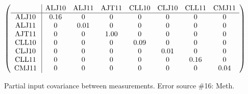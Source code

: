 \begin{table}[H]
\scriptsize
\begin{center}
\renewcommand{\arraystretch}{1.1}
\begin{math}\left(\begin{array}{c|ccccccc}
 & \mathrm{ALJ10} & 
\mathrm{ALJ11} & 
\mathrm{AJT11} & 
\mathrm{CLL10} & 
\mathrm{CLJ10} & 
\mathrm{CLL11} & 
\mathrm{CMJ11} \\
\hline
\mathrm{ALJ10} \hspace*{2pt} &       0.16 &  0 &  0 &  0 &  0 &  0 &  0 \\
\mathrm{ALJ11} \hspace*{2pt} &  0 &       0.01 &  0 &  0 &  0 &  0 &  0 \\
\mathrm{AJT11} \hspace*{2pt} &  0 &  0 &       1.00 &  0 &  0 &  0 &  0 \\
\mathrm{CLL10} \hspace*{2pt} &  0 &  0 &  0 &       0.09 &  0 &  0 &  0 \\
\mathrm{CLJ10} \hspace*{2pt} &  0 &  0 &  0 &  0 &       0.01 &  0 &  0 \\
\mathrm{CLL11} \hspace*{2pt} &  0 &  0 &  0 &  0 &  0 &       0.16 &  0 \\
\mathrm{CMJ11} \hspace*{2pt} &  0 &  0 &  0 &  0 &  0 &  0 &       0.04 \\
\end{array}\right)\end{math}
\caption{Partial input covariance between measurements. Error source \#16: Meth.}
\renewcommand{\arraystretch}{1}
\end{center}
\end{table}
